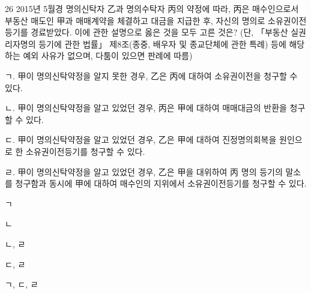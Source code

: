 \begin{question}{26}
2015년 5월경 명의신탁자 乙과 명의수탁자 丙의 약정에 따라, 丙은 매수인으로서 부동산 매도인 甲과 매매계약을 체결하고 대금을 지급한 후, 자신의 명의로 소유권이전등기를 경료받았다. 이에 관한 설명으로 옳은 것을 모두 고른 것은? (단, 「부동산 실권리자명의 등기에 관한 법률」 제8조(종중, 배우자 및 종교단체에 관한 특례) 등에 해당하는 예외 사유가 없으며, 다툼이 있으면 판례에 따름)
\begin{framedtext}
ㄱ. 甲이 명의신탁약정을 알지 못한 경우, 乙은 丙에 대하여 소유권이전을 청구할 수 있다. \par
ㄴ. 甲이 명의신탁약정을 알고 있었던 경우, 丙은 甲에 대하여 매매대금의 반환을 청구할 수 있다. \par
ㄷ. 甲이 명의신탁약정을 알고 있었던 경우, 乙은 甲에 대하여 진정명의회복을 원인으로 한 소유권이전등기를 청구할 수 있다. \par
ㄹ. 甲이 명의신탁약정을 알고 있었던 경우, 乙은 甲을 대위하여 丙 명의 등기의 말소를 청구함과 동시에 甲에 대하여 매수인의 지위에서 소유권이전등기를 청구할 수 있다. \par
\end{framedtext}
\begin{choices}
  \item ㄱ
  \item ㄴ
  \item ㄴ, ㄹ
  \item ㄷ, ㄹ
  \item ㄱ, ㄷ, ㄹ
\end{choices}
\end{question}
